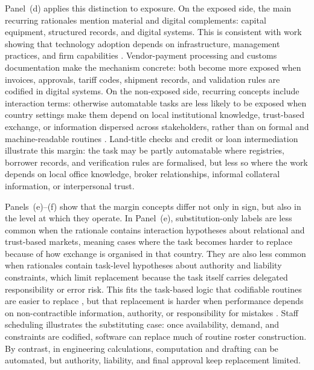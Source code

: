 \documentclass[11pt]{article}
\begin{document}
Panel~(d) applies this distinction to exposure. On the exposed side, the main recurring rationales mention material and digital complements: capital equipment, structured records, and digital systems. This is consistent with work showing that technology adoption depends on infrastructure, management practices, and firm capabilities \citep{AndrewsNicolettiTimiliotis2020DigitalDiffusionEER,BloomVanReenen2007,CireraCominCruz2024}. Vendor-payment processing and customs documentation make the mechanism concrete: both become more exposed when invoices, approvals, tariff codes, shipment records, and validation rules are codified in digital systems. On the non-exposed side, recurring concepts include interaction terms: otherwise automatable tasks are less likely to be exposed when country settings make them depend on local institutional knowledge, trust-based exchange, or information dispersed across stakeholders, rather than on formal and machine-readable routines \citep{North1990Institutions,BakerGibbonsMurphy2002RelationalContracts}. Land-title checks and credit or loan intermediation illustrate this margin: the task may be partly automatable where registries, borrower records, and verification rules are formalised, but less so where the work depends on local office knowledge, broker relationships, informal collateral information, or interpersonal trust.

Panels~(e)--(f) show that the margin concepts differ not only in sign, but also in the level at which they operate. In Panel~(e), substitution-only labels are less common when the rationale contains interaction hypotheses about relational and trust-based markets, meaning cases where the task becomes harder to replace because of how exchange is organised in that country. They are also less common when rationales contain task-level hypotheses about authority and liability constraints, which limit replacement because the task itself carries delegated responsibility or error risk. This fits the task-based logic that codifiable routines are easier to replace \citep{AutorLevyMurnane2003,AcemogluRestrepo2018}, but that replacement is harder when performance depends on non-contractible information, authority, or responsibility for mistakes \citep{BakerGibbonsMurphy2002RelationalContracts}. Staff scheduling illustrates the substituting case: once availability, demand, and constraints are codified, software can replace much of routine roster construction. By contrast, in engineering calculations, computation and drafting can be automated, but authority, liability, and final approval keep replacement limited.
\end{document}
